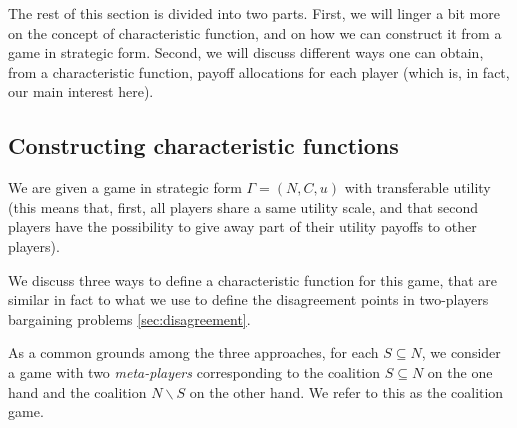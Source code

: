 


The rest of this section is divided into two parts. First, we will linger a bit more on the concept of characteristic function, and on how we can construct it from a game in strategic form. Second, we will discuss different ways one can obtain, from a characteristic function, payoff allocations for each player (which is, in fact, our main interest here).



\subsection{Constructing characteristic functions}

We are given a game in strategic form $\Gamma = (N, C, u)$ with transferable utility (this means that, first, all players share a same utility scale, and that second players have the possibility to give away part of their utility payoffs to other players).

We discuss three ways to define a characteristic function for this game, that are similar in fact to what we use to define the disagreement points in two-players bargaining problems \ref{sec:disagreement}.

As a common grounds among the three approaches, for each $S \subseteq N$,
we consider a game with two \emph{meta-players} corresponding to the coalition $S \subseteq N$ on the one hand and the coalition $N \backslash S$ on the other hand. We refer to this as the coalition game.

